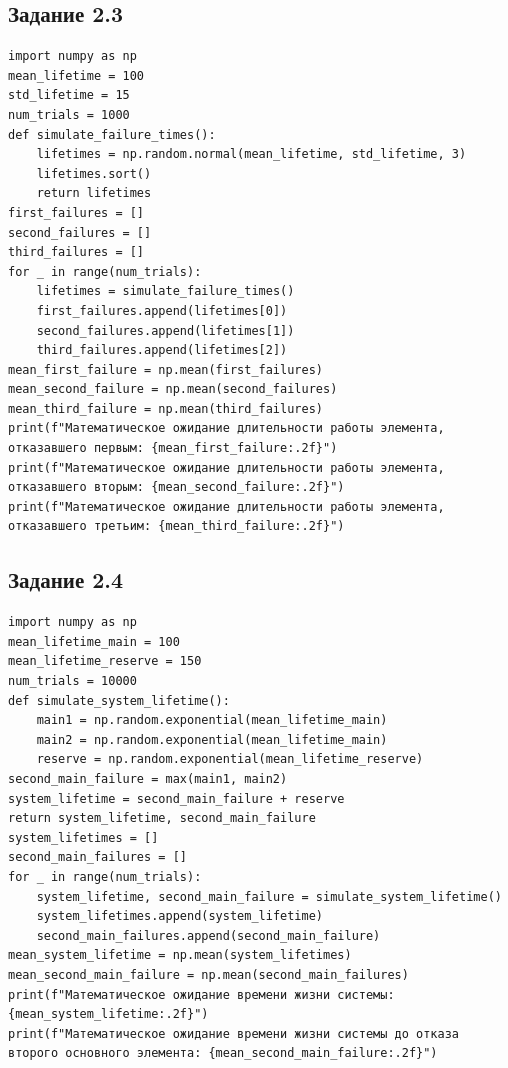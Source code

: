 \documentclass[otchet]{SCWorks}
\begin{document}
\subsection{Задание 2.3}
\label{ap_task2_3}
\begin{verbatim}
import numpy as np
mean_lifetime = 100 
std_lifetime = 15    
num_trials = 1000    
def simulate_failure_times():
    lifetimes = np.random.normal(mean_lifetime, std_lifetime, 3)
    lifetimes.sort() 
    return lifetimes
first_failures = []
second_failures = []
third_failures = []
for _ in range(num_trials):
    lifetimes = simulate_failure_times()
    first_failures.append(lifetimes[0])
    second_failures.append(lifetimes[1])
    third_failures.append(lifetimes[2])
mean_first_failure = np.mean(first_failures)
mean_second_failure = np.mean(second_failures)
mean_third_failure = np.mean(third_failures)
print(f"Математическое ожидание длительности работы элемента, отказавшего первым: {mean_first_failure:.2f}")
print(f"Математическое ожидание длительности работы элемента, отказавшего вторым: {mean_second_failure:.2f}")
print(f"Математическое ожидание длительности работы элемента, отказавшего третьим: {mean_third_failure:.2f}")
\end{verbatim}
\subsection{Задание 2.4}
\label{ap_task2_4}
\begin{verbatim}
import numpy as np
mean_lifetime_main = 100
mean_lifetime_reserve = 150
num_trials = 10000
def simulate_system_lifetime():
    main1 = np.random.exponential(mean_lifetime_main)
    main2 = np.random.exponential(mean_lifetime_main)
    reserve = np.random.exponential(mean_lifetime_reserve)
second_main_failure = max(main1, main2)
system_lifetime = second_main_failure + reserve
return system_lifetime, second_main_failure
system_lifetimes = []
second_main_failures = []
for _ in range(num_trials):
    system_lifetime, second_main_failure = simulate_system_lifetime()
    system_lifetimes.append(system_lifetime)
    second_main_failures.append(second_main_failure)
mean_system_lifetime = np.mean(system_lifetimes)
mean_second_main_failure = np.mean(second_main_failures)
print(f"Математическое ожидание времени жизни системы: {mean_system_lifetime:.2f}")
print(f"Математическое ожидание времени жизни системы до отказа второго основного элемента: {mean_second_main_failure:.2f}")    
\end{verbatim}
\end{document}
